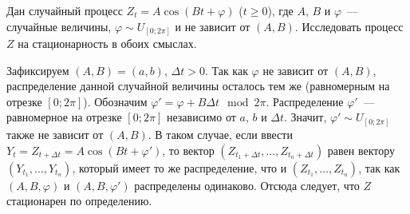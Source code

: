 \begin{exercise}
    \label{exercise:stationarity:cosine}
    Дан случайный процесс $ Z_t = A \cos (B t + \varphi) $ ($ t \geqslant 0 $),
    где $ A $, $ B $ и $ \varphi $~--- случайные величины,
    $ \varphi \sim U_{[0; 2\pi]} $ и не зависит от $ (A, B) $.
    Исследовать процесс $ Z $ на стационарность в обоих смыслах.
\end{exercise}

\begin{solution}
    Зафиксируем $ (A, B) = (a, b) $, $ \Delta t > 0 $.
    Так как $ \varphi $ не зависит от $ (A, B) $,
    распределение данной случайной величины осталось тем же (равномерным на отрезке $ [0; 2\pi] $).
    Обозначим $ \varphi' = \varphi + B \Delta t \mod 2 \pi $.
    Распределение $ \varphi' $~--- равномерное на отрезке $ [0; 2\pi] $ независимо от $ a $, $ b $ и $ \Delta t $.
    Значит, $ \varphi' \sim U_{[0;2\pi]} $ также не зависит от $ (A,B) $.
    В таком случае, если ввести $ Y_t = Z_{t + \Delta t} = A \cos (B t + \varphi') $,
    то вектор $ (Z_{t_1 + \Delta t}, \ldots, Z_{t_n + \Delta t}) $ равен вектору $ (Y_{t_1}, \ldots, Y_{t_n}) $,
    который имеет то же распределение, что и $ (Z_{t_1}, \ldots, Z_{t_n}) $,
    так как $ (A, B, \varphi) $ и $ (A, B, \varphi') $ распределены одинаково.
    Отсюда следует, что $ Z $ стационарен по определению.
\end{solution}
